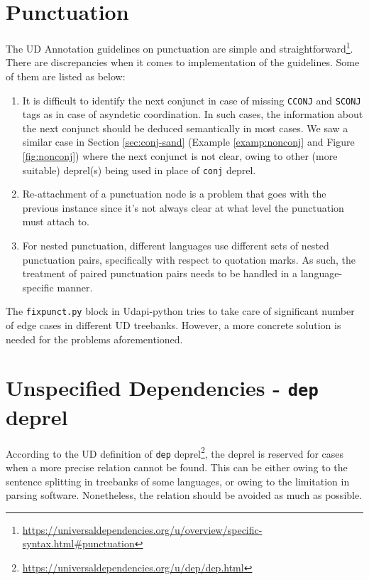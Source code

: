 \section{Punctuation}

The UD Annotation guidelines on punctuation are simple and straightforward\footnote{\url{https://universaldependencies.org/u/overview/specific-syntax.html\#punctuation}}. There are discrepancies when it comes to implementation of the guidelines. Some of them are listed as below:

\begin{enumerate}
    \item It is difficult to identify the next conjunct in case of missing \verb|CCONJ| and \verb|SCONJ| tags as in case of asyndetic coordination. In such cases, the information about the next conjunct should be deduced semantically in most cases. We saw a similar case in Section \ref{sec:conj-sand} (Example \ref{examp:nonconj} and Figure \ref{fig:nonconj}) where the next conjunct is not clear, owing to other (more suitable) deprel(s) being used in place of \verb|conj| deprel.
    \item Re-attachment of a punctuation node is a problem that goes with the previous instance since it's not always clear at what level the punctuation must attach to.
    \item For nested punctuation, different languages use different sets of nested punctuation pairs, specifically with respect to quotation marks. As such, the treatment of paired punctuation pairs needs to be handled in a language-specific manner.
\end{enumerate}

The \verb|fixpunct.py| block in Udapi-python \citep{udapi} tries to take care of significant number of edge cases in different UD treebanks. However, a more concrete solution is needed for the problems aforementioned.

\section{Unspecified Dependencies - \texttt{dep} deprel}

According to the UD definition of \verb|dep| deprel\footnote{\url{https://universaldependencies.org/u/dep/dep.html}}, the deprel is reserved for cases when a more precise relation cannot be found. This can be either owing to the sentence splitting in treebanks of some languages, or owing to the limitation in parsing software. Nonetheless, the relation should be avoided as much as possible.

